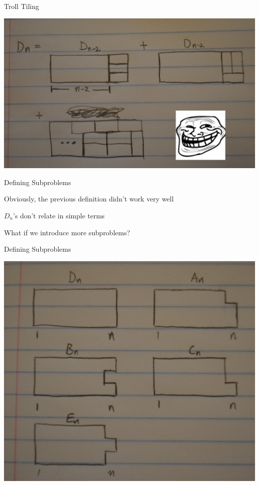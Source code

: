 \documentclass[13pt,onlymath]{beamer}
\begin{document}
\begin{frame}{Troll Tiling}
\begin{center}
\includegraphics[height=0.7\textheight]{figures/trolltiling}
\end{center}
\end{frame}

\begin{frame}{Defining Subproblems}
\BIT
\item Obviously, the previous definition didn't work very well
\item $D_n$'s don't relate in simple terms
\vfill
\item What if we introduce more subproblems?
\EIT
\end{frame}

\begin{frame}{Defining Subproblems}
\begin{center}
\includegraphics[height=0.7\textheight]{figures/tritiling_sub1}
\end{center}
\end{frame}
\end{document}
